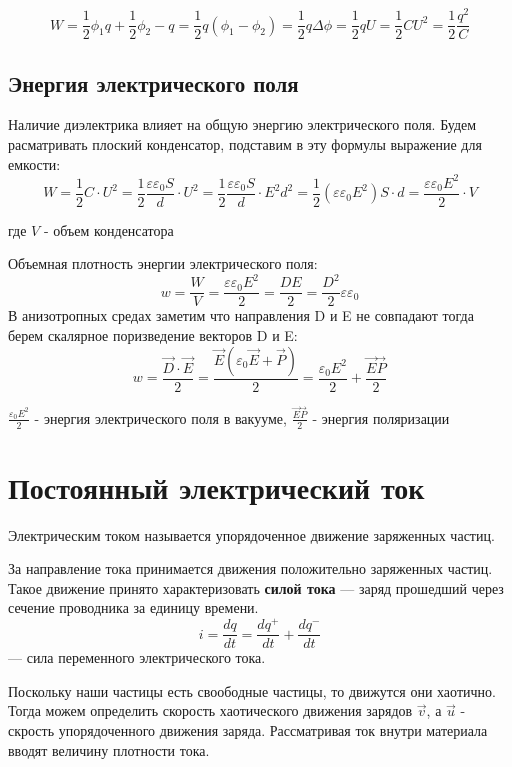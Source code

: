 \documentclass[../main.tex]{subfiles}
\begin{document}
\[ W = \frac{1}{2}\phi_1 q + \frac{1}{2}\phi_2 -q = \frac{1}{2}q (\phi_1 - \phi_2) = \frac{1}{2} q \Delta \phi
    = \frac{1}{2} q U = \frac{1}{2} C U^2 =\frac{1}{2} \frac{q^2}{C}\]
\subsection{Энергия электрического поля}
Наличие диэлектрика влияет на общую энергию электрического поля. Будем расматривать плоский конденсатор, подставим в эту формулы выражение для емкости:
\[ W = \frac{1}{2} C \cdot U^2 = \frac{1}{2} \frac{\varepsilon \varepsilon_0 S}{d} \cdot U^2 = \frac{1}{2} \frac{\varepsilon \varepsilon_0 S}{d} \cdot E^2 d^2 = \frac{1}{2}(\varepsilon \varepsilon_0 E^2) S \cdot d =
    \frac{\varepsilon \varepsilon_ 0 E^2}{2} \cdot V\]
\begin{center}
    где $V$ - объем конденсатора
\end{center}

Объемная плотность энергии электрического поля:
\[w = \frac{W}{V} = \frac{\varepsilon \varepsilon_ 0 E^2}{2} = \frac{D E}{2} = \frac{D^2}{2} \varepsilon \varepsilon_0\]
В анизотропных средах заметим что направления D и E не совпадают тогда берем скалярное поризведение векторов D и E:
\[w = \frac{\vec D \cdot \vec E}{2} = \frac{\vec E (\varepsilon_0 \vec E + \vec P)}{2} = \frac{\varepsilon_0 E^2}{2} + \frac{\vec E \vec P}{2}\]
\begin{center}
    $\frac{\varepsilon_0 E^2}{2}$ - энергия электрического поля в вакууме,
    \newline
    $\frac{\vec E \vec P}{2}$ - энергия поляризации
\end{center}

\section{Постоянный электрический ток}

 Электрическим током называется упорядоченное движение заряженных частиц.

За направление тока принимается движения положительно заряженных частиц.
 Такое движение принято характеризовать \textbf{силой тока}  --- заряд прошедший через сечение проводника за единицу времени.
\[i = \frac{dq}{dt} = \frac{dq ^{+}}{dt} + \frac{dq ^{-}}{dt}\] --- сила переменного электрического тока.

Поскольку наши частицы есть своободные частицы, то движутся они хаотично. Тогда можем определить скорость хаотического движения зарядов $\vec v$,
а $\vec u$ - скрость упорядоченного движения заряда. Рассматривая ток внутри материала вводят величину плотности тока.
\end{document}
